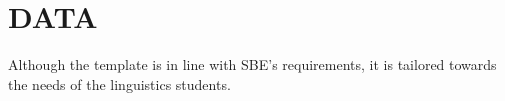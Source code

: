 \chapter{\MakeUppercase{data}}
Although the template is in line with SBE's requirements, it is tailored towards the needs of the linguistics students.








